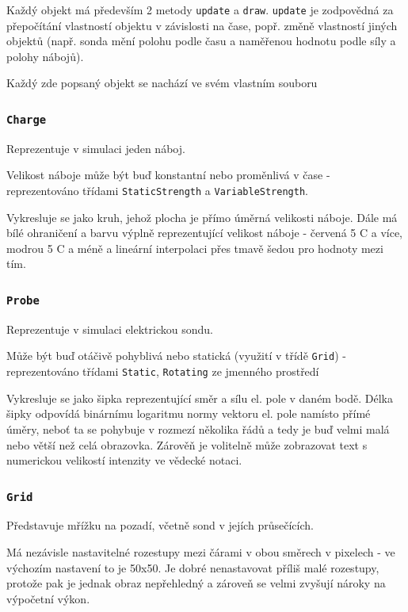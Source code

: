 \documentclass[12pt]{article}
\newcommand{\code}[1]{\mbox{\texttt{#1}}}
\begin{document}
Každý objekt má především 2 metody \code{update} a \code{draw}. \code{update} je
zodpovědná za přepočítání vlastností objektu v závislosti na čase, popř. změně
vlastností jiných objektů (např. sonda mění polohu podle času a naměřenou
hodnotu podle síly a polohy nábojů).

Každý zde popsaný objekt se nachází ve svém vlastním souboru

\subsubsection{\code{Charge}}

Reprezentuje v simulaci jeden náboj. 

Velikost náboje může být buď konstantní nebo proměnlivá v čase - reprezentováno
třídami \code{StaticStrength} a \code{VariableStrength}. 

Vykresluje se jako kruh, jehož plocha je přímo úměrná velikosti náboje. Dále má
bílé ohraničení a barvu výplně reprezentující velikost náboje - červená 5 C a více,
modrou 5 C a méně a lineární interpolaci přes tmavě šedou pro hodnoty mezi tím.

\subsubsection{\code{Probe}}

Reprezentuje v simulaci elektrickou sondu.

Může být buď otáčivě pohyblivá nebo statická (využití v třídě \code{Grid}) -
reprezentováno třídami \code{Static}, \code{Rotating} ze jmenného prostředí

Vykresluje se jako šipka reprezentující směr a sílu el. pole v daném bodě.
Délka šipky odpovídá binárnímu logaritmu normy vektoru el. pole namísto přímé
úměry, neboť ta se pohybuje v rozmezí několika řádů a tedy je buď velmi malá
nebo větší než celá obrazovka. Zárověň je volitelně může zobrazovat text s
numerickou velikostí intenzity ve vědecké notaci.

\subsubsection{\code{Grid}}

Představuje mřížku na pozadí, včetně sond v jejích průsečících.

Má nezávisle nastavitelné rozestupy mezi čárami v obou směrech v pixelech - ve
výchozím nastavení to je 50x50. Je dobré nenastavovat příliš malé rozestupy,
protože pak je jednak obraz nepřehledný a zároveň se velmi zvyšují nároky na
výpočetní výkon.
\end{document}
